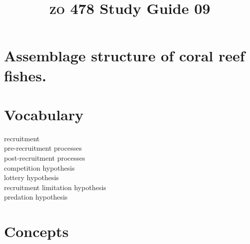 \documentclass[letterpaper]{tufte-handout}
\title{{\scshape zo} 478 Study Guide 09}
\date{} %
\begin{document}
\maketitle	%

\section*{Assemblage structure of coral reef fishes.}

\section{Vocabulary} 
\vspace{-1\baselineskip}
\begin{multicols}{2}
recruitment \\
pre-recruitment processes \\
post-recruitment processes \\
competition hypothesis \\
lottery hypothesis \\
recruitment limitation hypothesis \\
predation hypothesis 
\end{multicols}

\section{Concepts}
\end{document}
